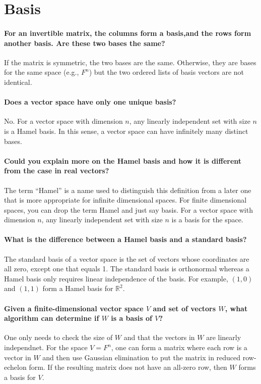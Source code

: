 \documentclass[10pt,english]{article}
\begin{document}
\section{Basis}

\paragraph{For an invertible matrix, the columns form a basis,and the rows form another basis. Are these two bases the same?}
 
If the matrix is symmetric, the two bases are the same.
Otherwise, they are bases for the same space (e.g., $F^n$) but the two ordered lists of basis vectors are not identical.


\paragraph{Does a vector space have only one unique basis?}
No. For a vector space with dimension $n$, any linearly independent set with size $n$ is a Hamel basis. In this sense, a vector space can have infinitely many distinct bases.


\paragraph{Could you explain more on the Hamel basis and how it is different from the case in real vectors?}
The term ``Hamel'' is a name used to distinguish this definition from a later one that is more appropriate for infinite dimensional spaces.  For finite dimensional spaces, you can drop the term Hamel and just say basis.
For a vector space with dimension $n$, any linearly independent set with size $n$ is a basis for the space.


\paragraph{What is the difference between a Hamel basis and a standard basis?}
The standard basis of a vector space is the set of vectors whose coordinates are all zero, except one that equals 1. The standard basis is orthonormal whereas a Hamel basis only requires linear independence of the basis.
For example, $(1,0)$ and $(1,1)$ form a Hamel basis for $\mathbb{R}^2$.


\paragraph{Given a finite-dimensional vector space $V$ and set of vectors $W$, what algorithm can determine if $W$ is a basis of $V$?}
One only needs to check the size of $W$ and that the vectors in $W$ are linearly independnet.
For the space $V=F^n$, one can form a matrix where each row is a vector in $W$ and then use Gaussian elimination to put the matrix in reduced row-echelon form.
If the resulting matrix does not have an all-zero row, then $W$ forms a basis for $V$.
\end{document}
